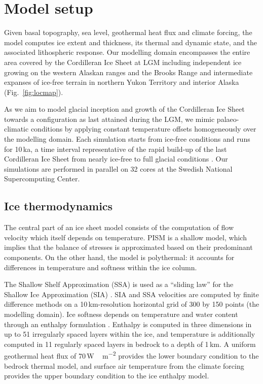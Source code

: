 \section{Model setup}
\label{sec:model}

Given basal topography, sea level, geothermal heat flux and climate forcing, the model computes ice extent and thickness, its thermal and dynamic state, and the associated lithospheric response. Our modelling domain encompasses the entire area covered by the Cordilleran Ice Sheet at LGM including independent ice growing on the western Alaskan ranges and the Brooks Range and intermediate expanses of ice-free terrain in northern Yukon Territory and interior Alaska (Fig.~\ref{fig:locmap}).

As we aim to model glacial inception and growth of the Cordilleran Ice Sheet towards a configuration as last attained during the LGM, we mimic palaeo-climatic conditions by applying constant temperature offsets homogeneously over the modelling domain. Each simulation starts from ice-free conditions and runs for 10\,ka, a time interval representative of the rapid build-up of the last Cordilleran Ice Sheet from nearly ice-free to full glacial conditions \citep{clague-1989,stroeven-etal-2010}. Our simulations are performed in parallel on 32 cores at the Swedish National Supercomputing Center.

\subsection{Ice thermodynamics}

The central part of an ice sheet model consists of the computation of flow velocity which itself depends on temperature. PISM is a shallow model, which implies that the balance of stresses is approximated based on their predominant components. On the other hand, the model is polythermal: it accounts for differences in temperature and softness within the ice column.

The Shallow Shelf Approximation (SSA) is used as a ``sliding law'' for the Shallow Ice Approximation (SIA) \citep{bueler-brown-2009,winkelmann-etal-2011}. SIA and SSA velocities are computed by finite difference methods on a 10\,km-resolution horizontal grid of 300 by 150 points (the modelling domain). Ice softness depends on temperature and water content through an enthalpy formulation \citep{aschwanden-blatter-2009,aschwanden-etal-2012}. Enthalpy is computed in three dimensions in up to 51 irregularly spaced layers within the ice, and temperature is additionally computed in 11 regularly spaced layers in bedrock to a depth of 1\,km. A uniform geothermal heat flux of 70\,\unit{W\,m^{-2}} provides the lower boundary condition to the bedrock thermal model, and surface air temperature from the climate forcing provides the upper boundary condition to the ice enthalpy model.

